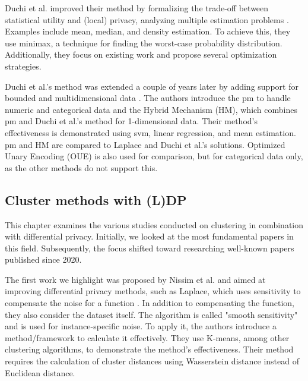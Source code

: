 Duchi et al. improved their method by formalizing the trade-off between statistical utility and (local) privacy, analyzing multiple estimation problems \citep{duchi_minimax_2017}.
Examples include mean, median, and density estimation.
To achieve this, they use minimax, a technique for finding the worst-case probability distribution.
Additionally, they focus on existing work and propose several optimization strategies.

Duchi et al.'s method was extended a couple of years later by adding support for bounded and multidimensional data \citep{wang_collecting_2019}.
The authors introduce the \gls{pm} to handle numeric and categorical data and the Hybrid Mechanism (HM), which combines \gls{pm} and Duchi et al.'s method for 1-dimensional data.
Their method's effectiveness is demonstrated using \gls{svm}, linear regression, and mean estimation.
\gls{pm} and HM are compared to Laplace and Duchi et al.'s solutions.
Optimized Unary Encoding (OUE) \citep{wang_locally_nodate} is also used for comparison, but for categorical data only, as the other methods do not support this.

\subsection{Cluster methods with (L)DP}
This chapter examines the various studies conducted on clustering in combination with differential privacy.
Initially, we looked at the most fundamental papers in this field. Subsequently, the focus shifted toward researching well-known papers published since 2020.

The first work we highlight was proposed by Nissim et al. and aimed at improving differential privacy methods, such as Laplace, which uses sensitivity to compensate the noise for a function \citep{nissim_smooth_2007}.
In addition to compensating the function, they also consider the dataset itself.
The algorithm is called "smooth sensitivity" and is used for instance-specific noise.
To apply it, the authors introduce a method/framework to calculate it effectively.
They use K-means, among other clustering algorithms, to demonstrate the method's effectiveness.
Their method requires the calculation of cluster distances using Wasserstein distance instead of Euclidean distance.

